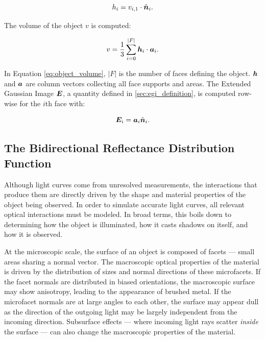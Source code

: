 \begin{equation} \label{eq:face_support}
    h_i = v_{i,1} \cdot \hat{\bm{n}}_i.
\end{equation}

The volume of the object $v$ is computed:

\begin{equation} \label{eq:object_volume}
    v = \frac{1}{3} \sum_{i=0}^{ \lvert F \rvert}\bm{h}_i \cdot \bm{a}_i.
\end{equation}

In Equation \ref{eq:object_volume}, $\lvert F \rvert$ is the number of faces defining the object. $\bm{h}$ and $\bm{a}$ are column vectors collecting all face supports and areas. The Extended Gaussian Image $\bm{E}$, a quantity defined in \ref{sec:egi_definition}, is computed row-wise for the $i$th face with:

\begin{equation} \label{eq:egi_definition}
    \bm{E}_i = \bm{a}_i \hat{\bm{n}}_i.
\end{equation}

\subsection{The Bidirectional Reflectance Distribution Function}

Although light curves come from unresolved measurements, the interactions that produce them are directly driven by the shape and material properties of the object being observed. In order to simulate accurate light curves, all relevant optical interactions must be modeled. In broad terms, this boils down to determining how the object is illuminated, how it casts shadows on itself, and how it is observed. 

At the microscopic scale, the surface of an object is composed of facets ---  small areas sharing a normal vector. The macroscopic optical properties of the material is driven by the distribution of sizes and normal directions of these microfacets. If the facet normals are distributed in biased orientations, the macroscopic surface may show anisotropy, leading to the appearance of brushed metal. If the microfacet normals are at large angles to each other, the surface may appear dull as the direction of the outgoing light may be largely independent from the incoming direction. Subsurface effects ---  where incoming light rays scatter \textit{inside} the surface --- can also change the macroscopic properties of the material. 

